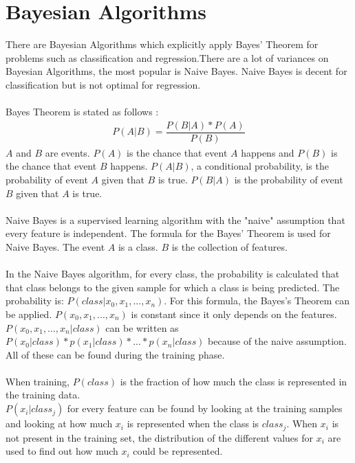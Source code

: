 \section{Bayesian Algorithms}
\label{bayesalg}
There are Bayesian Algorithms which explicitly apply Bayes’ Theorem for problems such as classification and regression.There are a lot of variances on Bayesian Algorithms, the most popular is Naive Bayes. \cite{mlcat} Naive Bayes is decent for classification but is not optimal for regression. \cite{naivebayes} \\\\
Bayes Theorem is stated as follows \cite{bayes}:
\begin{align}
P(A|B) = \dfrac{P(B|A) * P(A)}{P(B)}
\end{align}
$A$ and $B$ are events. $P(A)$ is the chance that event $A$ happens and $P(B)$ is the chance that event $B$ happens. $P(A | B)$, a conditional probability, is the probability of event $A$ given that $B$ is true.  $P(B | A)$ is the probability of event $B$ given that $A$ is true. \cite{bayes} \\\\
Naive Bayes is a supervised learning algorithm with the "naive" assumption that every feature is independent. The formula for the Bayes' Theorem is used for Naive Bayes. The event $A$ is a class. $B$ is the collection of features. \cite{naivebayes} \\
\\
In the Naive Bayes algorithm, for every class, the probability is calculated that that class belongs to the given sample for which a class is being predicted. The probability is: $P(class | x_0, x_1, ..., x_n)$. For this formula, the Bayes's Theorem can be applied. $P(x_0, x_1, ..., x_n)$ is constant since it only depends on the features. $P(x_0, x_1, ..., x_n | class)$ can be written as $P(x_0 | class) * p(x_1 | class) * ... * p(x_n | class)$ because of the naive assumption. All of these can be found during the training phase. \\
\\
When training, $P(class)$ is the fraction of how much the class is represented in the training data.\\ $P(x_i | class_j)$ for every feature can be found by looking at the training samples and looking at how much $x_i$ is represented when the class is $class_j$. When $x_i$ is not present in the training set, the distribution of the different values for $x_i$ are used to find out how much $x_i$ could be represented.

